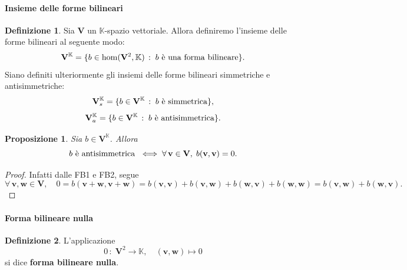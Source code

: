 \documentclass{article}
\theoremstyle{plain}
\newtheorem{prop}[thm]{Proposizione}
\theoremstyle{definition}
\newtheorem{defn}{Definizione}[section]
\theoremstyle{remark}
\begin{document}
\vspace{10pt}

\paragraph{Insieme delle forme bilineari}
\begin{bxthm}
\begin{defn}
    Sia $\mathbf{V}$ un $\mathbb{K}$-spazio vettoriale. Allora definiremo l'insieme delle forme bilineari al seguente modo:
    \[ \mathbf{V}^{\mathbb{K}}=\{b\in\hom(\mathbf{V}^2,\mathbb{K})\,:\;b \textup{ è una forma bilineare}\}.\]
    Siano definiti ulteriormente gli insiemi delle forme bilineari simmetriche e antisimmetriche:
    \[ \mathbf{V}_s^{\mathbb{K}}=\{b\in\mathbf{V}^{\mathbb{K}}\,:\;b \textup{ è simmetrica}\},\]
    \[ \mathbf{V}_a^{\mathbb{K}}=\{b\in\mathbf{V}^{\mathbb{K}}\,:\;b \textup{ è antisimmetrica}\}.\]
\end{defn}
\end{bxthm}

\vspace{10pt}

\begin{bxthm}
\begin{prop}\label{formbilnull}
    Sia $b\in\mathbf{V}^{\mathbb{K}}$. Allora
    \[b\textup{ è antisimmetrica }\iff \forall\,\mathbf{v}\in\mathbf{V},\;b(\mathbf{v},\mathbf{v})=0.\]
\end{prop}
\end{bxthm}
\begin{proof}
    Infatti dalle FB1 e FB2, segue
    \[\forall\,\mathbf{v},\mathbf{w}\in\mathbf{V},\quad0=b(\mathbf{v}+\mathbf{w},\mathbf{v}+\mathbf{w})=b(\mathbf{v},\mathbf{v})+b(\mathbf{v},\mathbf{w})+b(\mathbf{w},\mathbf{v})+b(\mathbf{w},\mathbf{w})=b(\mathbf{v},\mathbf{w})+b(\mathbf{w},\mathbf{v}).\]
\end{proof}

\vspace{10pt}

\paragraph{Forma bilineare nulla}
\begin{bxthm}
\begin{defn}
L'applicazione 
\[\mathit{0}\,:\;\mathbf{V}^2\to\mathbb{K},\quad (\mathbf{v},\mathbf{w})\mapsto0\]
si dice \textbf{forma bilineare nulla}.    
\end{defn}
\end{bxthm}
\end{document}
